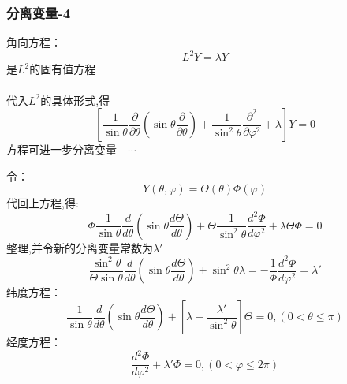 \begin{frame}
\frametitle{分离变量-4}
角向方程：
\begin{equation*}
  L^2 Y=\lambda Y
\end{equation*}	
是$L^2$的固有值方程\\
~~\\ 	
代入$L^2$的具体形式,得
\begin{equation*}
  \left[ \frac{1}{ \sin \theta  } \frac{\partial }{\partial \theta } (\sin \theta \frac{\partial }{\partial \theta } )
  +\frac{1}{ \sin^2 \theta  } \frac{\partial^2}{\partial\varphi ^2}  +\lambda \right] Y=0 
\end{equation*}	
方程可进一步分离变量　$\cdots$ 
\end{frame}	

\begin{frame}
令：
\begin{equation*}
  Y(\theta,\varphi)= \Theta(\theta) \Phi(\varphi)
\end{equation*}	
代回上方程,得:
\begin{equation*}
  \Phi \frac{1}{\sin \theta} \frac{d}{d \theta}\left(\sin \theta \frac{d \Theta}{d \theta}\right)+\Theta \frac{1}{\sin ^{2} \theta} \frac{d^{2} \Phi}{d \varphi^{2}}+\lambda \Theta \Phi=0
\end{equation*}	
整理,并令新的分离变量常数为$\lambda'$
\begin{equation*}
  \frac{\sin ^{2} \theta}{\Theta \sin \theta} \frac{d}{d \theta}\left(\sin \theta \frac{d \Theta}{d \theta}\right)+\sin ^{2} \theta \lambda=-\frac{1}{\Phi} \frac{d^{2} \Phi}{d \varphi^{2}}=\lambda'
\end{equation*}	
纬度方程：
\begin{equation}\label{eq:theta}
  \frac{1}{\sin \theta} \frac{d}{d \theta}\left(\sin \theta \frac{d \Theta}{d \theta}\right)+\left[\lambda-\frac{\lambda'}{\sin ^{2} \theta}\right] \Theta=0,(0<\theta \le \pi)
\end{equation}		
经度方程：
\begin{equation}\label{eq:varphi}
  \frac{d^{2} \Phi}{d \varphi^{2}}+\lambda' \Phi=0,(0<\varphi\le2 \pi)
\end{equation}		
\end{frame}	

